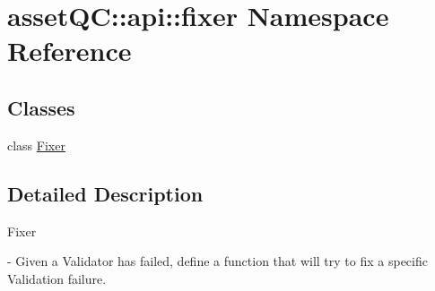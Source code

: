 \hypertarget{namespaceassetQC_1_1api_1_1fixer}{\section{asset\-Q\-C\-:\-:api\-:\-:fixer \-Namespace \-Reference}
\label{d9/da8/namespaceassetQC_1_1api_1_1fixer}
}
\subsection*{\-Classes}
\begin{DoxyCompactItemize}
\item 
class \hyperlink{classassetQC_1_1api_1_1fixer_1_1Fixer}{\-Fixer}
\end{DoxyCompactItemize}


\subsection{\-Detailed \-Description}
\begin{DoxyVerb}
Fixer

- Given a Validator has failed, define a function that will try to fix a
  specific Validation failure.
\end{DoxyVerb}
 